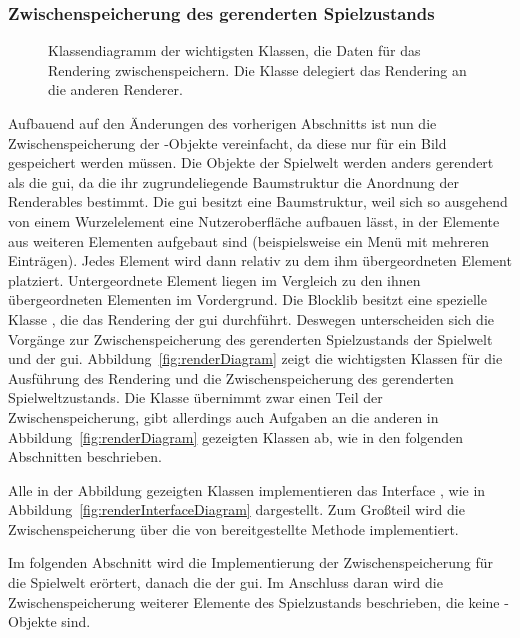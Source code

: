 \subsubsection{Zwischenspeicherung des gerenderten Spielzustands}\label{sec:saveRenderState}
\begin{figure}
	\centering
	
	\caption[Klassendiagramm der wichtigsten Klassen, die Daten für das Rendering zwischenspeichern.]{Klassendiagramm der wichtigsten Klassen, die Daten für das Rendering zwischenspeichern. Die Klasse \classMasterRenderer{} delegiert das Rendering an die anderen Renderer.}\label{fig:renderDiagram}
\end{figure}
Aufbauend auf den Änderungen des vorherigen Abschnitts ist nun die Zwischenspeicherung der \classRenderable{}-Objekte vereinfacht, da diese nur für ein Bild gespeichert werden müssen. Die Objekte der Spielwelt werden anders gerendert als die \ac{gui}, da die ihr zugrundeliegende Baumstruktur die Anordnung der Renderables bestimmt. Die \ac{gui} besitzt eine Baumstruktur, weil sich so ausgehend von einem Wurzelelement eine Nutzeroberfläche aufbauen lässt, in der Elemente aus weiteren Elementen aufgebaut sind (beispielsweise ein Menü mit mehreren Einträgen). Jedes Element wird dann relativ zu dem ihm übergeordneten Element platziert. Untergeordnete Element liegen im Vergleich zu den ihnen übergeordneten Elementen im Vordergrund. Die Blocklib besitzt eine spezielle Klasse \classUIRenderer{}, die das Rendering der \ac{gui} durchführt. Deswegen unterscheiden sich die Vorgänge zur Zwischenspeicherung des gerenderten Spielzustands der Spielwelt und der \ac{gui}. Abbildung~\vref{fig:renderDiagram} zeigt die wichtigsten Klassen für die Ausführung des Rendering und die Zwischenspeicherung des gerenderten Spielweltzustands. Die Klasse \classMasterRenderer{} übernimmt zwar einen Teil der Zwischenspeicherung, gibt allerdings auch Aufgaben an die anderen in Abbildung~\vref{fig:renderDiagram} gezeigten Klassen ab, wie in den folgenden Abschnitten beschrieben.

Alle in der Abbildung gezeigten Klassen implementieren das Interface \classDoubleBuffer{}, wie in Abbildung~\vref{fig:renderInterfaceDiagram} dargestellt. Zum Großteil wird die Zwischenspeicherung über die von \classDoubleBuffer{} bereitgestellte Methode  implementiert.

Im folgenden Abschnitt wird die Implementierung der Zwischenspeicherung für die Spielwelt erörtert, danach die der \ac{gui}. Im Anschluss daran wird die Zwischenspeicherung weiterer Elemente des Spielzustands beschrieben, die keine \classRenderable{}-Objekte sind.

